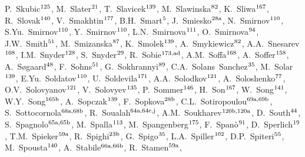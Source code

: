 \begin{flushleft}
P.~Skubic$^\textrm{\scriptsize 125}$,    
M.~Slater$^\textrm{\scriptsize 21}$,    
T.~Slavicek$^\textrm{\scriptsize 139}$,    
M.~Slawinska$^\textrm{\scriptsize 82}$,    
K.~Sliwa$^\textrm{\scriptsize 167}$,    
R.~Slovak$^\textrm{\scriptsize 140}$,    
V.~Smakhtin$^\textrm{\scriptsize 177}$,    
B.H.~Smart$^\textrm{\scriptsize 5}$,    
J.~Smiesko$^\textrm{\scriptsize 28a}$,    
N.~Smirnov$^\textrm{\scriptsize 110}$,    
S.Yu.~Smirnov$^\textrm{\scriptsize 110}$,    
Y.~Smirnov$^\textrm{\scriptsize 110}$,    
L.N.~Smirnova$^\textrm{\scriptsize 111}$,    
O.~Smirnova$^\textrm{\scriptsize 94}$,    
J.W.~Smith$^\textrm{\scriptsize 51}$,    
M.~Smizanska$^\textrm{\scriptsize 87}$,    
K.~Smolek$^\textrm{\scriptsize 139}$,    
A.~Smykiewicz$^\textrm{\scriptsize 82}$,    
A.A.~Snesarev$^\textrm{\scriptsize 108}$,    
I.M.~Snyder$^\textrm{\scriptsize 128}$,    
S.~Snyder$^\textrm{\scriptsize 29}$,    
R.~Sobie$^\textrm{\scriptsize 173,ad}$,    
A.M.~Soffa$^\textrm{\scriptsize 168}$,    
A.~Soffer$^\textrm{\scriptsize 158}$,    
A.~S{\o}gaard$^\textrm{\scriptsize 48}$,    
F.~Sohns$^\textrm{\scriptsize 51}$,    
G.~Sokhrannyi$^\textrm{\scriptsize 89}$,    
C.A.~Solans~Sanchez$^\textrm{\scriptsize 35}$,    
M.~Solar$^\textrm{\scriptsize 139}$,    
E.Yu.~Soldatov$^\textrm{\scriptsize 110}$,    
U.~Soldevila$^\textrm{\scriptsize 171}$,    
A.A.~Solodkov$^\textrm{\scriptsize 121}$,    
A.~Soloshenko$^\textrm{\scriptsize 77}$,    
O.V.~Solovyanov$^\textrm{\scriptsize 121}$,    
V.~Solovyev$^\textrm{\scriptsize 135}$,    
P.~Sommer$^\textrm{\scriptsize 146}$,    
H.~Son$^\textrm{\scriptsize 167}$,    
W.~Song$^\textrm{\scriptsize 141}$,    
W.Y.~Song$^\textrm{\scriptsize 165b}$,    
A.~Sopczak$^\textrm{\scriptsize 139}$,    
F.~Sopkova$^\textrm{\scriptsize 28b}$,    
C.L.~Sotiropoulou$^\textrm{\scriptsize 69a,69b}$,    
S.~Sottocornola$^\textrm{\scriptsize 68a,68b}$,    
R.~Soualah$^\textrm{\scriptsize 64a,64c,j}$,    
A.M.~Soukharev$^\textrm{\scriptsize 120b,120a}$,    
D.~South$^\textrm{\scriptsize 44}$,    
S.~Spagnolo$^\textrm{\scriptsize 65a,65b}$,    
M.~Spalla$^\textrm{\scriptsize 113}$,    
M.~Spangenberg$^\textrm{\scriptsize 175}$,    
F.~Span\`o$^\textrm{\scriptsize 91}$,    
D.~Sperlich$^\textrm{\scriptsize 19}$,    
T.M.~Spieker$^\textrm{\scriptsize 59a}$,    
R.~Spighi$^\textrm{\scriptsize 23b}$,    
G.~Spigo$^\textrm{\scriptsize 35}$,    
L.A.~Spiller$^\textrm{\scriptsize 102}$,    
D.P.~Spiteri$^\textrm{\scriptsize 55}$,    
M.~Spousta$^\textrm{\scriptsize 140}$,    
A.~Stabile$^\textrm{\scriptsize 66a,66b}$,    
R.~Stamen$^\textrm{\scriptsize 59a}$,    

\end{flushleft}
